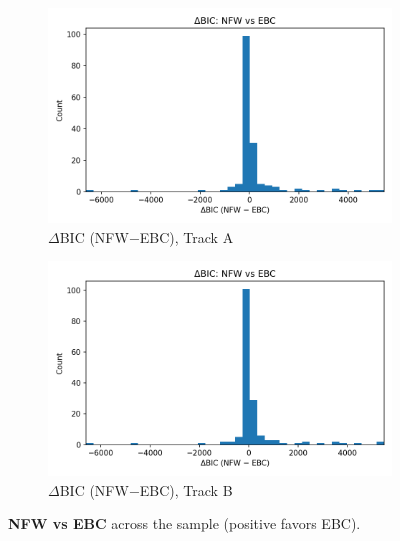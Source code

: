 \documentclass[12pt]{article}
\begin{document}
\begin{figure}[H]
  \centering
  \begin{subfigure}{0.48\linewidth}
    \centering\includegraphics[width=\linewidth]{figs_trackA_dense/dBIC_M2_minus_M0.png}
    \caption{$\Delta$BIC (NFW$-$EBC), Track A}
  \end{subfigure}\hfill
  \begin{subfigure}{0.48\linewidth}
    \centering\includegraphics[width=\linewidth]{figs_trackB_dense/dBIC_M2_minus_M0.png}
    \caption{$\Delta$BIC (NFW$-$EBC), Track B}
  \end{subfigure}
  \caption{\textbf{NFW vs EBC} across the sample (positive favors EBC).}
  \label{fig:dbicM2M0}
\end{figure}
\end{document}
